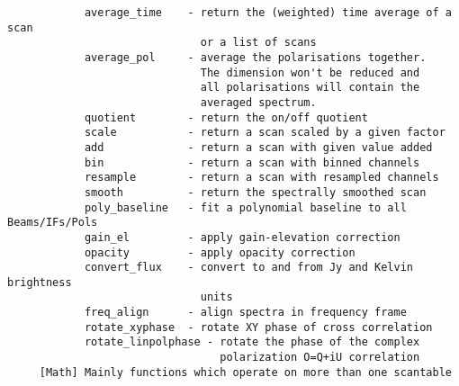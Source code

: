 \documentclass[11pt]{article}
\begin{document}
\begin{verbatim}
            average_time    - return the (weighted) time average of a scan
                              or a list of scans
            average_pol     - average the polarisations together.
                              The dimension won't be reduced and
                              all polarisations will contain the
                              averaged spectrum.
            quotient        - return the on/off quotient
            scale           - return a scan scaled by a given factor
            add             - return a scan with given value added
            bin             - return a scan with binned channels
            resample        - return a scan with resampled channels
            smooth          - return the spectrally smoothed scan
            poly_baseline   - fit a polynomial baseline to all Beams/IFs/Pols
            gain_el         - apply gain-elevation correction
            opacity         - apply opacity correction
            convert_flux    - convert to and from Jy and Kelvin brightness
                              units
            freq_align      - align spectra in frequency frame
            rotate_xyphase  - rotate XY phase of cross correlation
            rotate_linpolphase - rotate the phase of the complex
                                 polarization O=Q+iU correlation
     [Math] Mainly functions which operate on more than one scantable


\end{verbatim}
\end{document}

